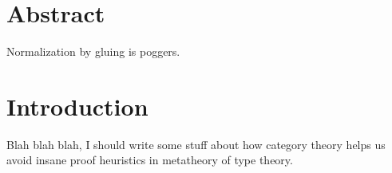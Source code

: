 \documentclass[12pt,twoside]{reedthesis}
\theoremstyle{definition}
\theoremstyle{remark}
\theoremstyle{plain}
\begin{document}
\tableofcontents
\listoftables
\listoffigures

\chapter*{Abstract}
Normalization by gluing is poggers.



\mainmatter%
\pagestyle{fancyplain} %


\chapter*{Introduction}


Blah blah blah, I should write some stuff about how category theory helps us
avoid insane proof heuristics in metatheory of type theory.
\end{document}
